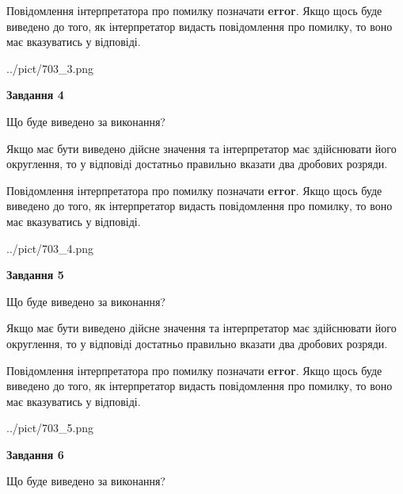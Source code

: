 \documentclass[12pt, ukrainian]{article}
\begin{document}
{\begin {Large}
Повідомлення інтерпретатора про помилку позначати \textbf{error}.
Якщо щось буде виведено до того, як інтерпретатор видасть повідомлення про помилку, 
то воно має вказуватись у відповіді. \par

\begin{center}
	{../pict/703_3.png}
\end{center}
\newpage

{\begin {center}\textbf{Завдання 4}\end {center}}\par
Що буде виведено за виконання? \par

Якщо має бути виведено дійсне значення та інтерпретатор має здійснювати його округлення, 
то у відповіді достатньо правильно вказати два дробових розряди.

Повідомлення інтерпретатора про помилку позначати \textbf{error}.
Якщо щось буде виведено до того, як інтерпретатор видасть повідомлення про помилку, 
то воно має вказуватись у відповіді. \par

\begin{center}
	{../pict/703_4.png}
\end{center}
\newpage

{\begin {center}\textbf{Завдання 5}\end {center}}\par
Що буде виведено за виконання? \par

Якщо має бути виведено дійсне значення та інтерпретатор має здійснювати його округлення, 
то у відповіді достатньо правильно вказати два дробових розряди.

Повідомлення інтерпретатора про помилку позначати \textbf{error}.
Якщо щось буде виведено до того, як інтерпретатор видасть повідомлення про помилку, 
то воно має вказуватись у відповіді. \par

\begin{center}
	{../pict/703_5.png}
\end{center}
\newpage

{\begin {center}\textbf{Завдання 6}\end {center}}\par
Що буде виведено за виконання? \par


\end{Large}}
\end{document}
